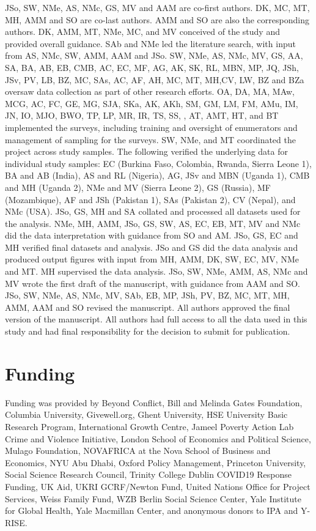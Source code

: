 \documentclass[
  12pt,
]{article}
\begin{document}
JSo, SW, NMe, AS, NMc, GS, MV and AAM are co-first authors. DK, MC, MT, MH, AMM and SO are co-last authors. AMM and SO are also the corresponding authors.
DK, AMM, MT, NMe, MC, and MV conceived of the study and provided overall guidance.
SAb and NMe led the literature search, with input from AS, NMc, SW, AMM, AAM and JSo.
SW, NMe, AS, NMc, MV, GS, AA, SA, BA, AB, EB, CMB, AC, EC, MF, AG, AK, SK, RL, MBN, MP, JQ, JSh, JSv, PV, LB, BZ, MC, SAs, AC, AF, AH, MC, MT, MH,CV, LW, BZ and BZa oversaw data collection as part of other research efforts.
OA, DA, MA, MAw, MCG, AC, FC, GE, MG, SJA, SKa, AK, AKh, SM, GM, LM, FM, AMu, IM, JN, IO, MJO, BWO, TP, LP, MR, IR, TS, SS, , AT, AMT, HT, and BT implemented the surveys, including training and oversight of enumerators and management of sampling for the surveys.
SW, NMe, and MT coordinated the project across study samples.
The following verified the underlying data for individual study samples: EC (Burkina Faso, Colombia, Rwanda, Sierra Leone 1), BA and AB (India), AS and RL (Nigeria), AG, JSv and MBN (Uganda 1), CMB and MH (Uganda 2), NMe and MV (Sierra Leone 2), GS (Russia), MF (Mozambique), AF and JSh (Pakistan 1), SAs (Pakistan 2), CV (Nepal), and NMc (USA).
JSo, GS, MH and SA collated and processed all datasets used for the analysis.
NMe, MH, AMM, JSo, GS, SW, AS, EC, EB, MT, MV and NMc did the data interpretation with guidance from SO and AM.
JSo, GS, EC and MH verified final datasets and analysis.
JSo and GS did the data analysis and produced output figures with input from MH, AMM, DK, SW, EC, MV, NMe and MT.
MH supervised the data analysis.
JSo, SW, NMe, AMM, AS, NMc and MV wrote the first draft of the manuscript, with guidance from AAM and SO.
JSo, SW, NMe, AS, NMc, MV, SAb, EB, MP, JSh, PV, BZ, MC, MT, MH, AMM, AAM and SO revised the manuscript.
All authors approved the final version of the manuscript. All authors had full access to all the data used in this study and had final responsibility for the decision to submit for publication.

\hypertarget{funding}{%
\section*{Funding}\label{funding}}

Funding was provided by Beyond Conflict, Bill and Melinda Gates Foundation, Columbia University, Givewell.org, Ghent University, HSE University Basic Research Program, International Growth Centre, Jameel Poverty Action Lab Crime and Violence Initiative, London School of Economics and Political Science, Mulago Foundation, NOVAFRICA at the Nova School of Business and Economics, NYU Abu Dhabi, Oxford Policy Management, Princeton University, Social Science Research Council, Trinity College Dublin COVID19 Response Funding, UK Aid, UKRI GCRF/Newton Fund, United Nations Office for Project Services, Weiss Family Fund, WZB Berlin Social Science Center, Yale Institute for Global Health, Yale Macmillan Center, and anonymous donors to IPA and Y-RISE.
\end{document}
